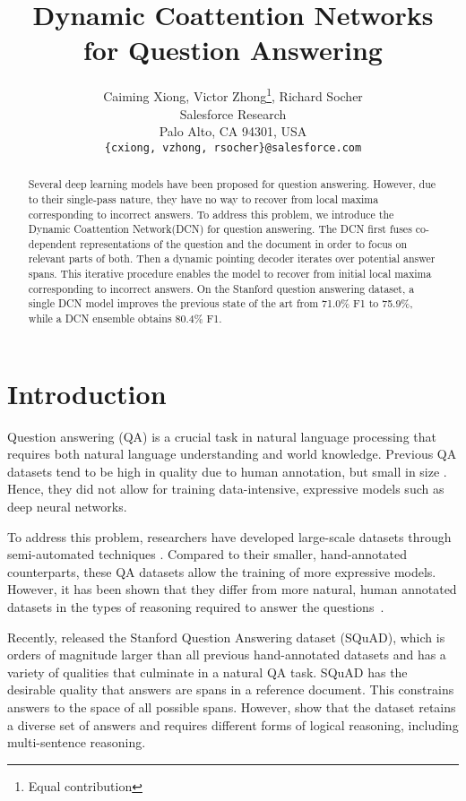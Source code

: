 \documentclass{article} \usepackage{iclr2017_conference,times}
\title{Dynamic Coattention Networks \\for Question Answering}
\author{Caiming Xiong\footnotemark[1], Victor Zhong\thanks{Equal contribution}, Richard Socher  \\
Salesforce Research \\
Palo Alto, CA 94301, USA \\
\texttt{\{cxiong, vzhong, rsocher\}@salesforce.com} \\
}
\newcommand{\squad}{SQuAD\xspace}
\newcommand{\ours}{DCN\xspace}
\newcommand{\oursfull}{Dynamic Coattention Network\xspace}
\newcommand{\testf}{80.4}
\newcommand{\testfsingle}{75.9}
\begin{document}
\maketitle

\begin{abstract}
Several deep learning models have been proposed for question answering.
However, due to their single-pass nature, they have no way to recover from local maxima corresponding to incorrect answers.
To address this problem, we introduce the \oursfull (\ours) for question answering.
The \ours first fuses co-dependent representations of the question and the document in order to focus on relevant parts of both.
Then a dynamic pointing decoder iterates over potential answer spans.
This iterative procedure enables the model to recover from initial local maxima corresponding to incorrect answers.
On the Stanford question answering dataset, a single \ours model improves the previous state of the art from 71.0\% F1 to \testfsingle\%, while a \ours ensemble obtains \testf\% F1.
\end{abstract}


\section{Introduction}

Question answering (QA) is a crucial task in natural language processing that requires both natural language understanding and world knowledge.
Previous QA datasets tend to be high in quality due to human annotation, but small in size \citep{berant2014modeling,richardson2013mctest}.
Hence, they did not allow for training data-intensive, expressive models such as deep neural networks.

To address this problem, researchers have developed large-scale datasets through semi-automated techniques \citep{hermann2015teaching,hill2015goldilocks}.
Compared to their smaller, hand-annotated counterparts, these QA datasets allow the training of more expressive models.
However, it has been shown that they differ from more natural, human annotated datasets in the types of reasoning required to answer the questions~\citep{chen2016thorough}.

Recently, \citet{rajpurkar2016squad} released the Stanford Question Answering dataset (\squad), which is orders of magnitude larger than all previous hand-annotated datasets and has a variety of qualities that culminate in a natural QA task.
\squad has the desirable quality that answers are spans in a reference document.
This constrains answers to the space of all possible spans.
However, \citet{rajpurkar2016squad} show that the dataset retains a diverse set of answers and requires different forms of logical reasoning, including multi-sentence reasoning.
\end{document}
